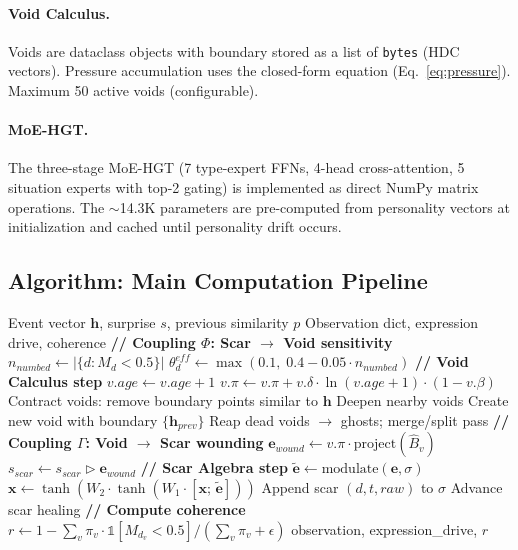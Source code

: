 \documentclass[11pt]{article}
\begin{document}
\paragraph{Void Calculus.} Voids are dataclass objects with boundary stored as a list of \texttt{bytes} (HDC vectors). Pressure accumulation uses the closed-form equation (Eq.~\ref{eq:pressure}). Maximum 50 active voids (configurable).

\paragraph{MoE-HGT.} The three-stage MoE-HGT (7 type-expert FFNs, 4-head cross-attention, 5 situation experts with top-2 gating) is implemented as direct NumPy matrix operations. The $\sim$14.3K parameters are pre-computed from personality vectors at initialization and cached until personality drift occurs.

\subsection{Algorithm: Main Computation Pipeline}

\begin{algorithm}[h]
\caption{Void-Scar Engine: Single Event Processing}
\label{alg:pipeline}
\begin{algorithmic}[1]
\REQUIRE Event vector $\mathbf{h}$, surprise $s$, previous similarity $p$
\ENSURE Observation dict, expression drive, coherence
\STATE \textbf{// Coupling $\Phi$: Scar $\to$ Void sensitivity}
\STATE $n_{numbed} \leftarrow |\{d : M_d < 0.5\}|$
\STATE $\theta_d^{eff} \leftarrow \max(0.1,\; 0.4 - 0.05 \cdot n_{numbed})$
\STATE \textbf{// Void Calculus step}
  \STATE $v.age \leftarrow v.age + 1$
  \STATE $v.\pi \leftarrow v.\pi + v.\delta \cdot \ln(v.age + 1) \cdot (1 - v.\beta)$
\ENDFOR
\STATE Contract voids: remove boundary points similar to $\mathbf{h}$
  \STATE Deepen nearby voids
\ENDIF
{}
  \STATE Create new void with boundary $\{\mathbf{h}_{prev}\}$
\ENDIF
\STATE Reap dead voids $\to$ ghosts; merge/split pass
\STATE \textbf{// Coupling $\Gamma$: Void $\to$ Scar wounding}
  \STATE $\mathbf{e}_{wound} \leftarrow v.\pi \cdot \text{project}(\hat{B}_v)$
  \STATE $s_{scar} \leftarrow s_{scar} \triangleright \mathbf{e}_{wound}$
\ENDFOR
\STATE \textbf{// Scar Algebra step}
\STATE $\tilde{\mathbf{e}} \leftarrow \text{modulate}(\mathbf{e}, \sigma)$ 
\STATE $\mathbf{x} \leftarrow \tanh(W_2 \cdot \tanh(W_1 \cdot [\mathbf{x};\, \tilde{\mathbf{e}}]))$ 
  \STATE Append scar $(d, t, raw)$ to $\sigma$ 
\ENDIF
\STATE Advance scar healing 
\STATE \textbf{// Compute coherence}
\STATE $r \leftarrow 1 - \sum_v \pi_v \cdot \mathbb{1}[M_{d_v} < 0.5] / (\sum_v \pi_v + \epsilon)$
\RETURN observation, expression\_drive, $r$
\end{algorithmic}
\end{algorithm}
\end{document}
